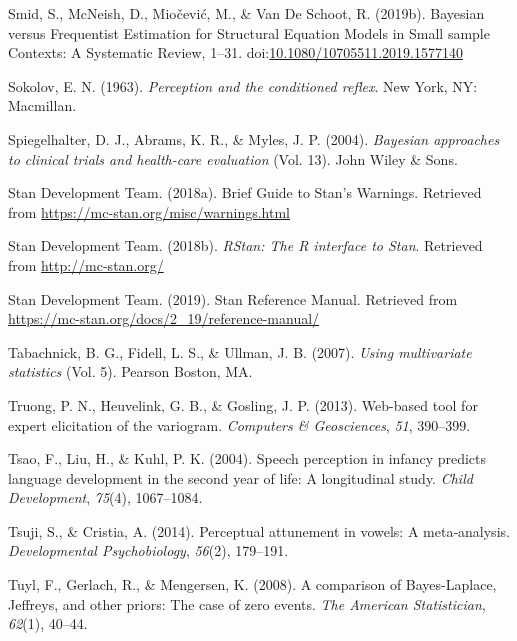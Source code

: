\documentclass[openright,titlepage,12pt,a4paper]{book}
\begin{document}
\leavevmode\hypertarget{ref-smid_bayesian_2019}{}%
Smid, S., McNeish, D., Miočević, M., \& Van De Schoot, R. (2019b). Bayesian versus Frequentist Estimation for Structural Equation Models in Small sample Contexts: A Systematic Review, 1--31. doi:\href{https://doi.org/10.1080/10705511.2019.1577140}{10.1080/10705511.2019.1577140}

\leavevmode\hypertarget{ref-sokolov_perception_1963}{}%
Sokolov, E. N. (1963). \emph{Perception and the conditioned reflex}. New York, NY: Macmillan.

\leavevmode\hypertarget{ref-spiegelhalter_bayesian_2004}{}%
Spiegelhalter, D. J., Abrams, K. R., \& Myles, J. P. (2004). \emph{Bayesian approaches to clinical trials and health-care evaluation} (Vol. 13). John Wiley \& Sons.

\leavevmode\hypertarget{ref-stan_development_team_brief_2018}{}%
Stan Development Team. (2018a). Brief Guide to Stan's Warnings. Retrieved from \url{https://mc-stan.org/misc/warnings.html}

\leavevmode\hypertarget{ref-stan_development_team_rstan:_2018}{}%
Stan Development Team. (2018b). \emph{RStan: The R interface to Stan}. Retrieved from \url{http://mc-stan.org/}

\leavevmode\hypertarget{ref-stan_development_team_stan_2019}{}%
Stan Development Team. (2019). Stan Reference Manual. Retrieved from \url{https://mc-stan.org/docs/2_19/reference-manual/}

\leavevmode\hypertarget{ref-tabachnick_using_2007}{}%
Tabachnick, B. G., Fidell, L. S., \& Ullman, J. B. (2007). \emph{Using multivariate statistics} (Vol. 5). Pearson Boston, MA.

\leavevmode\hypertarget{ref-truong_web-based_2013}{}%
Truong, P. N., Heuvelink, G. B., \& Gosling, J. P. (2013). Web-based tool for expert elicitation of the variogram. \emph{Computers \& Geosciences}, \emph{51}, 390--399.

\leavevmode\hypertarget{ref-tsao_speech_2004}{}%
Tsao, F., Liu, H., \& Kuhl, P. K. (2004). Speech perception in infancy predicts language development in the second year of life: A longitudinal study. \emph{Child Development}, \emph{75}(4), 1067--1084.

\leavevmode\hypertarget{ref-tsuji_perceptual_2014}{}%
Tsuji, S., \& Cristia, A. (2014). Perceptual attunement in vowels: A meta‐analysis. \emph{Developmental Psychobiology}, \emph{56}(2), 179--191.

\leavevmode\hypertarget{ref-tuyl_comparison_2008}{}%
Tuyl, F., Gerlach, R., \& Mengersen, K. (2008). A comparison of Bayes-Laplace, Jeffreys, and other priors: The case of zero events. \emph{The American Statistician}, \emph{62}(1), 40--44.
\end{document}
